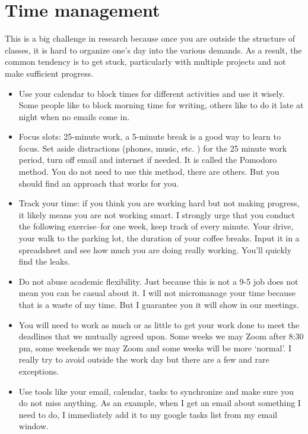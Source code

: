 \documentclass[12pt]{article}
\begin{document}
\section{Time management}

This is a big challenge in research because once you are outside the structure of classes, it is hard to organize one's day into the various demands.
As a result, the common tendency is to get stuck, particularly with multiple projects and not make sufficient progress.

\begin{itemize}
  \item Use your calendar to block times for different activities and use it wisely.
        Some people like to block morning time for writing, others like to do it late at night when no emails come in.
  \item Focus slots: 25-minute work, a 5-minute break is a good way to learn to focus.
        Set aside distractions (phones, music, etc. ) for the 25 minute work period, turn off email and internet if needed.
        It is called the Pomodoro method.
        You do not need to use this method, there are others.
        But you should find an approach that works for you.
  \item Track your time: if you think you are working hard but not making progress, it likely means you are not working smart.
        I strongly urge that you conduct the following exercise--for one week, keep track of every minute.
        Your drive, your walk to the parking lot, the duration of your coffee breaks.
        Input it in a spreadsheet and see how much you are doing really working.
        You'll quickly find the leaks.
  \item Do not abuse academic flexibility.
        Just because this is not a 9-5 job does not mean you can be casual about it.
        I will not micromanage your time because that is a waste of my time.
        But I guarantee you it will show in our meetings.
  \item You will need to work as much or as little to get your work done to meet the deadlines that we mutually agreed upon.
        Some weeks we may Zoom after 8:30 pm, some weekends we may Zoom and some weeks will be more `normal'.
        I really try to avoid outside the work day but there are a few and rare exceptions.
  \item Use tools like your email, calendar, tasks to synchronize and make sure you do not miss anything.
        As an example, when I get an email about something I need to do, I immediately add it to my google tasks list from my email window.

\end{itemize}
\end{document}
